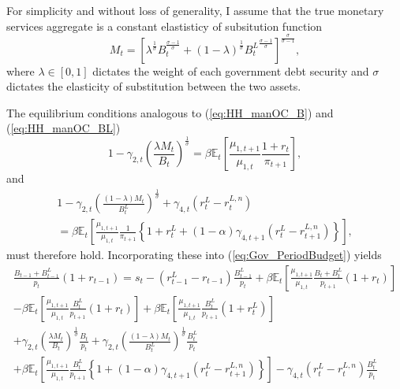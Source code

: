 \documentclass[11pt,a4paper,margin=1.5in]{article}
\begin{document}
For simplicity and without loss of generality, I assume that the true monetary services aggregate is a constant elastisticy of subsitution function
\begin{equation}
	M_t = \left[\lambda^{\frac{1}{\sigma}}B_t^{\frac{\sigma-1}{\sigma}} + (1-\lambda)^{\frac{1}{\sigma}}{B^L_t}^{\frac{\sigma-1}{\sigma}}\right]^{\frac{\sigma}{\sigma-1}},
	\label{eq:MS_CES}
\end{equation}
where $\lambda \in [0,1]$ dictates the weight of each government debt security and $\sigma$ dictates the elasticity of substitution between the two assets.


The equilibrium conditions analogous to (\ref{eq:HH_manOC_B}) and (\ref{eq:HH_manOC_BL})
\begin{equation*}
	1 - \gamma_{2,t}\left(\frac{\lambda M_t}{B_t}\right)^\frac{1}{\sigma} = \beta \mathbb{E}_t\!\left[\frac{\mu_{1,t+1}}{\mu_{1,t}}\frac{1+r_t}{\pi_{t+1}}\right],
	\label{eq:HH_manOC_B_Alt}
\end{equation*}
and 
\begin{multline*}
	1 - \gamma_{2,t}\left(\frac{(1-\lambda)M_t}{B^L_t}\right)^\frac{1}{\sigma} + \gamma_{4,t}\left(r^L_t-r^{L,n}_t\right) \\
	= \beta \mathbb{E}_t\!\left[\frac{\mu_{1,t+1}}{\mu_{1,t}}\frac{1}{\pi_{t+1}} \left\{ 1+r^L_t + (1-\alpha)\gamma_{4,t+1} \left(r^L_t-r^{L,n}_{t+1}\right)\right\}\right],
	\label{eq:HH_manOC_BL_Alt}
\end{multline*}
must therefore hold.
Incorporating these into (\ref{eq:Gov_PeriodBudget}) yields
\begin{multline}
	\frac{B_{t-1} + B^L_{t-1}}{p_t}(1+r_{t-1})= s_t  - (r_{t-1}^L - r_{t-1})\frac{B^L_{t-1}}{p_t} + \beta\mathbb{E}_t\left[\frac{\mu_{1,t+1}}{\mu_{1,t}} \frac{B_{t} +B^L_{t}}{p_{t+1}}(1+r_{t})\right] \\ 
		- \beta\mathbb{E}_t\left[\frac{\mu_{1,t+1}}{\mu_{1,t}} \frac{B^L_{t}}{p_{t+1}}(1+r_{t})\right] + \beta\mathbb{E}_t\left[\frac{\mu_{1,t+1}}{\mu_{1,t}} \frac{B^L_{t}}{p_{t+1}}(1+r^L_{t})\right] \\
		+  \gamma_{2,t}\left(\frac{\lambda M_t}{B_t}\right)^\frac{1}{\sigma}\frac{B_t}{p_t} +\gamma_{2,t}\left(\frac{(1-\lambda) M_t}{B^L_t}\right)^\frac{1}{\sigma}\frac{B^L_t}{p_t} \\
		+\beta\mathbb{E}_t\left[\frac{\mu_{1,t+1}}{\mu_{1,t}} \frac{B^L_t}{p_{t+1}}\left\{1+  (1-\alpha)\gamma_{4,t+1}\left(r^L_t - r^{L,n}_{t+1}\right)\right\}\right] - \gamma_{4,t}\left(r^L_t - r^{L,n}_t\right)\frac{B^L_t}{p_t}
\end{multline}
\end{document}
